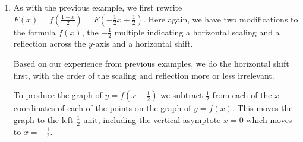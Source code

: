 \documentclass{ximera}
\begin{document}
\begin{example}
\begin{enumerate}
\begin{enumerate}
Next, we vertically scale the graph of $y=-f(x)$  by multiplying each of the $y$-coordinates of each of the points on the graph of $y=-f(x)$ by $\frac{1}{2}$ to obtain the graph of $y = -\frac{1}{2} f(x)$:

Notice we've reached the same graph of $y=-\frac{1}{2} f(x)$ that we had before, and, hence we arrive at the same final answer as before once we apply the vertical shift: $y = =-\frac{1}{2} f(x) + \frac{1}{2} = F(x)$.

The Desmos interactive below builds $y=F(x)$ from $y=f(x)$ using this new sequence of transformations.


\begin{center}
\end{center}

We check our answer as we have so many times before.  We start with the point $\left(1, \frac{1}{2}\right)$ and substitute $x=1$ into $y=\frac{1-f(x)}{2}$ to get $y=\frac{1-f(1)}{2}$.  From the graph of $f$, we know $f(1) = 0$, so we get $y=\frac{1-f(1)}{2} = \frac{1-0}{2} = \frac{1}{2}$.  This proves $\left(1, \frac{1}{2}\right)$ is on the graph of $y=\frac{1-f(x)}{2}$.  We invite the reader to check the remaining points.


Note that in the preceding example, since none of the transformations included adjusting the $x$-coordinates of points, the vertical asymptote, $x=0$ remained in place.

 
  \item  As with the previous example, we first rewrite $F(x)= f\left( \frac{1-x}{2} \right) = F\left( -\frac{1}{2}x + \frac{1}{2} \right)$.  Here again, we have two modifications to the formula $f(x)$, the $-\frac{1}{2}$ multiple indicating a horizontal scaling and a reflection across the $y$-axis and a horizontal shift. 
  
  \smallskip
  
   Based on our experience from previous examples, we do the horizontal shift first, with the order of the scaling and reflection more or less irrelevant.   
  
  \smallskip
  
  To  produce the graph of $y = f\left(x+\frac{1}{2}\right)$ we subtract $\frac{1}{2}$ from each of the $x$-coordinates of each of the points on the graph of $y=f(x)$.  This moves the graph to the left $\frac{1}{2}$ unit, including the vertical asymptote $x=0$ which moves to $x = -\frac{1}{2}$.
  



\end{enumerate}
\end{enumerate}
\end{example}
\end{document}
